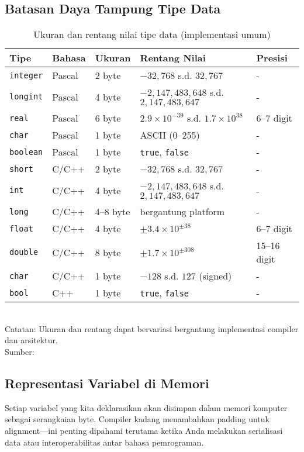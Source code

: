 \documentclass[../main.tex]{subfiles}
\begin{document}
\subsection{Batasan Daya Tampung Tipe Data}
\begin{table}[H]
  \centering
  \caption{Ukuran dan rentang nilai tipe data (implementasi umum)}
  \begin{tabular}{@{}lllll@{}}
    \toprule
    Tipe & Bahasa & Ukuran & Rentang Nilai & Presisi \\
    \midrule
    \texttt{integer} & Pascal & 2 byte & $-32{,}768$ s.d. $32{,}767$ & - \\
    \texttt{longint} & Pascal & 4 byte & $-2{,}147{,}483{,}648$ s.d. $2{,}147{,}483{,}647$ & - \\
    \texttt{real} & Pascal & 6 byte & $2.9 \times 10^{-39}$ s.d. $1.7 \times 10^{38}$ & 6--7 digit \\
    \texttt{char} & Pascal & 1 byte & ASCII (0--255) & - \\
    \texttt{boolean} & Pascal & 1 byte & \texttt{true}, \texttt{false} & - \\
    \midrule
    \texttt{short} & C/C++ & 2 byte & $-32{,}768$ s.d. $32{,}767$ & - \\
    \texttt{int} & C/C++ & 4 byte & $-2{,}147{,}483{,}648$ s.d. $2{,}147{,}483{,}647$ & - \\
    \texttt{long} & C/C++ & 4--8 byte & bergantung platform & - \\
    \texttt{float} & C/C++ & 4 byte & $\pm 3.4 \times 10^{\pm 38}$ & 6--7 digit \\
    \texttt{double} & C/C++ & 8 byte & $\pm 1.7 \times 10^{\pm 308}$ & 15--16 digit \\
    \texttt{char} & C/C++ & 1 byte & $-128$ s.d. $127$ (signed) & - \\
    \texttt{bool} & C++ & 1 byte & \texttt{true}, \texttt{false} & - \\
    \bottomrule
  \end{tabular}
  \\Catatan: Ukuran dan rentang dapat bervariasi bergantung implementasi compiler dan arsitektur.
  \\Sumber: \parencite{free-pascal-docs,iso-c-draft-n1570,cpp-fundamental-types}
\end{table}

\subsection{Representasi Variabel di Memori}
Setiap variabel yang kita deklarasikan akan disimpan dalam memori komputer sebagai serangkaian byte. Compiler kadang menambahkan padding untuk alignment—ini penting dipahami terutama ketika Anda melakukan serialisasi data atau interoperabilitas antar bahasa pemrograman.
\end{document}
